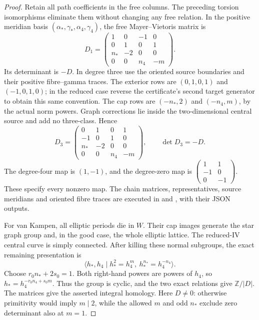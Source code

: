\begin{proof}
Retain all path coefficients in the free columns. The preceding
torsion isomorphisms eliminate them without changing any free
relation. In the positive meridian basis
\((\alpha_*,\gamma_*,\alpha_4,\gamma_4)\), the free
Mayer--Vietoris matrix is
\[
 D_1=\begin{pmatrix}
 1&0&-1&0\\0&1&0&1\\n_*&-2&0&0\\0&0&n_4&-m
 \end{pmatrix}.                                               \tag{P3F.38.6}
\]
Its determinant is \(-D\). In degree three use the oriented
source boundaries and their positive fibre--gamma traces. The
exterior rows are \((0,1,0,1)\) and \((-1,0,1,0)\); in
the reduced case reverse the certificate's second target generator
to obtain this same convention. The cap rows are
\((-n_*,2)\) and \((-n_4,m)\), by the actual norm powers.
Graph corrections lie inside the two-dimensional central source
and add no three-class. Hence
\[
 D_3=\begin{pmatrix}
 0&1&0&1\\-1&0&1&0\\n_*&-2&0&0\\0&0&n_4&-m
 \end{pmatrix},\qquad\det D_3=-D.                           \tag{P3F.38.7}
\]
The degree-four map is \((1,-1)\), and the degree-zero map is
\(\left(\begin{smallmatrix}1&1\\-1&0\\0&-1\end{smallmatrix}\right)\).
These specify every nonzero map. The chain matrices, representatives,
source meridians and oriented fibre traces are executed in
 and
, with their JSON
outputs.

For van Kampen, all elliptic periods die in \(W\). Their cap
images generate the star graph group and, in the good case, the
whole elliptic lattice. The reduced-IV central curve is simply
connected. After killing these normal subgroups, the exact remaining
presentation is
\[
 \langle h_*,h_4\mid h_*^2=h_4^m,
                         \ h_*^{n_*}=h_4^{-n_4}\rangle.
\]
Choose \(r_0n_*+2s_0=1\). Both right-hand powers are powers of
\(h_4\), so \(h_*=h_4^{-r_0n_4+s_0m}\). Thus the group is
cyclic, and the two exact relations give \(\mathbb Z/|D|\).
The matrices give the asserted integral homology. Here \(D\ne0\):
otherwise primitivity would imply \(m\mid2\), while the allowed
\(m\) and odd \(n_*\) exclude zero determinant also at \(m=1\).


\end{proof}
